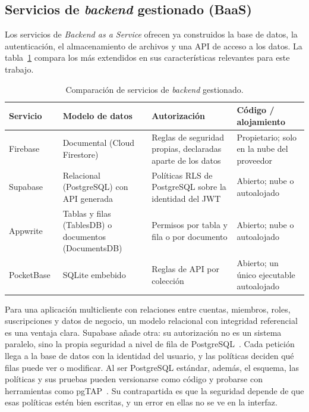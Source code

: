 \subsection{Servicios de \textit{backend} gestionado (BaaS)}
\label{sec:ctx-baas}

Los servicios de \textit{Backend as a Service} ofrecen ya construidos la base
de datos, la autenticación, el almacenamiento de archivos y una API de acceso a
los datos. La tabla~\ref{tab:ctx-baas} compara los más extendidos en sus
características relevantes para este trabajo.

\begin{table}[htbp]
  \centering
  \small
  \caption{Comparación de servicios de \textit{backend} gestionado.}
  \label{tab:ctx-baas}
  \begin{tabularx}{\textwidth}{@{}l>{\raggedright\arraybackslash}X>{\raggedright\arraybackslash}X>{\raggedright\arraybackslash}p{2.6cm}@{}}
    \toprule
    \textbf{Servicio} & \textbf{Modelo de datos} & \textbf{Autorización} & \textbf{Código / alojamiento} \\
    \midrule
    Firebase~\cite{firebase-docs} & Documental (Cloud Firestore) & Reglas de seguridad propias, declaradas aparte de los datos & Propietario; solo en la nube del proveedor \\
    Supabase~\cite{supabase-docs} & Relacional (PostgreSQL) con API generada & Políticas RLS de PostgreSQL sobre la identidad del JWT~\cite{supabase-rls} & Abierto; nube o autoalojado \\
    Appwrite~\cite{appwrite-docs} & Tablas y filas (TablesDB) o documentos (DocumentsDB) & Permisos por tabla y fila o por documento & Abierto; nube o autoalojado \\
    PocketBase~\cite{pocketbase} & SQLite embebido & Reglas de API por colección & Abierto; un único ejecutable autoalojado \\
    \bottomrule
  \end{tabularx}
\end{table}

Para una aplicación multicliente con relaciones entre cuentas, miembros,
roles, suscripciones y datos de negocio, un modelo relacional con integridad
referencial es una ventaja clara. Supabase añade otra: su autorización no es
un sistema paralelo, sino la propia seguridad a nivel de fila de
PostgreSQL~\cite{postgresql-rls}. Cada petición llega a la base de datos con
la identidad del usuario, y las políticas deciden qué filas puede ver o
modificar. Al ser PostgreSQL estándar, además, el esquema, las políticas y sus
pruebas pueden versionarse como código y probarse con herramientas como
pgTAP~\cite{pgtap}. Su contrapartida es que la seguridad depende de que esas
políticas estén bien escritas, y un error en ellas no se ve en la interfaz.

